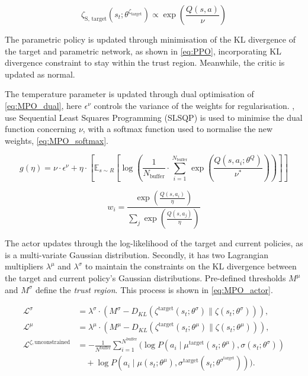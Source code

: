 \begin{equation}
    \zeta_{\text{S, target}}(s_t; \theta^{\zeta_{\text{target}}}) \varpropto  \exp\left(\frac{Q(s, a)}{\nu}\right)
\label{eq:Estep}
\end{equation}

The parametric policy is updated through minimisation of the KL divergence of the target and parametric network, as shown in \autoref{eq:PPO}, incorporating  KL divergence constraint to stay within the trust region. Meanwhile, the critic is updated as normal.

The temperature parameter is updated through dual optimisation of \autoref{eq:MPO_dual}, here \(\epsilon^\nu\) controls the variance of the weights for regularisation. \cite{prior2024jaxrl}, use Sequential Least Squares Programming (SLSQP) is used to minimise the dual function concerning $\nu$, with a softmax function used to normalise the new weights, \autoref{eq:MPO_softmax}.


\begin{equation}
    g(\eta) = \nu \cdot \epsilon^{\nu} + \eta \cdot [\mathbb{E}_{s\sim R}[\log(\frac{1}{N_{\text{buffer}}}\cdot\sum_{i=1}^{N_{\text{buffer}}}\exp(\frac{Q(s, a_i; \theta^Q)}{\nu^*}))]]
\label{eq:MPO_dual}
\end{equation}

\begin{equation}
    w_i = \frac{\exp(\frac{Q(s, a_i)}{\eta})}{\sum_j \exp(\frac{Q(s, a_j)}{\eta})}
\label{eq:MPO_softmax}
\end{equation}

The actor updates through the log-likelihood of the target and current policies, as is a multi-variate Gaussian distribution. Secondly, it has two Lagrangian multipliers \(\lambda^\mu\) and \(\lambda^\sigma\) to maintain the constraints on the KL divergence between the target and current policy's Gaussian distributions. Pre-defined thresholds \(M^\mu\) and \(M^\sigma\) define the \textit{trust region}. This process is shown in \autoref{eq:MPO_actor}.

\begin{equation}
\begin{aligned}
    \mathcal{L}^\sigma &= \lambda^\sigma \cdot \left(M^\sigma - D_{KL}(\zeta^{\text{target}}(s_t; \theta^\sigma) \parallel \zeta(s_t; \theta^\sigma))\right), \\
    \mathcal{L}^\mu &= \lambda^\mu \cdot \left(M^\mu - D_{KL}(\zeta^{\text{target}}(s_t; \theta^\mu) \parallel \zeta(s_t; \theta^\mu))\right), \\
    \mathcal{L}^{\zeta, \text{unconstrained}} &= - \frac{1}{N^{\text{buffer}}} \sum_{i=1}^{N^{\text{buffer}}} \Big( \log P(a_i \mid \mu^{\text{target}}(s_t; \theta^\mu), \sigma(s_t; \theta^\sigma)) \\
    &\quad + \log P(a_i \mid \mu(s_t; \theta^\mu), \sigma^{\text{target}}(s_t; \theta^{\sigma^{\text{target}}})) \Big).
\end{aligned}
\label{eq:MPO_actor}
\end{equation}


